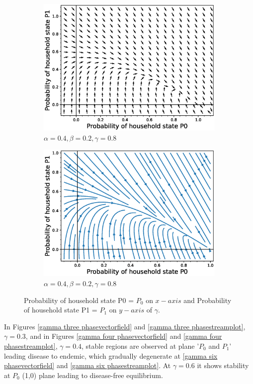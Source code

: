 \documentclass[paper=a4, fontsize=11pt, twoside, BCOR=12mm, parskip=full, listof=totoc]{scrreprt}
\begin{document}
{\begin{figure}[H]
\begin{subfigure}[b]{0.4\linewidth}
		\includegraphics[width=\linewidth]{phase_portrait/043_a5.eps}
		\caption{\(\alpha=0.4, \beta=0.2, \gamma=0.8\)}
		\label{gamma eight phasevectorfield}
	\end{subfigure}
	\begin{subfigure}[b]{0.4\linewidth}
		\includegraphics[width=\linewidth]{phase_portrait/043_a5s.eps}
		\caption{\(\alpha=0.4, \beta=0.2, \gamma=0.8\)}
		\label{gamma eight phasestreamplot}
	\end{subfigure}
	\caption{Probability of household state P0 = $P_0$ on $x-axis$ and Probability of household state P1 = $P_1$ on $y-axis$ of $\gamma$.}
	\label{plot of vector fields of $P_0$ on x axis and $P_1$ on y axis for gamma}
   \end{figure}
In Figures \ref{gamma three phasevectorfield} and \ref{gamma three phasestreamplot}, \(\gamma = 0.3\), and in Figures \ref{gamma four phasevectorfield} and \ref{gamma four phasestreamplot}, \(\gamma = 0.4\), stable regions are observed at plane '\(P_0\) and \(P_1\)' leading disease to endemic, which gradually degenerate at \ref{gamma six phasevectorfield} and \ref{gamma six phasestreamplot}. At \(\gamma = 0.6\) it shows stability at \(P_0\) (1,0) plane leading to disease-free equilibrium.

}
\end{document}
